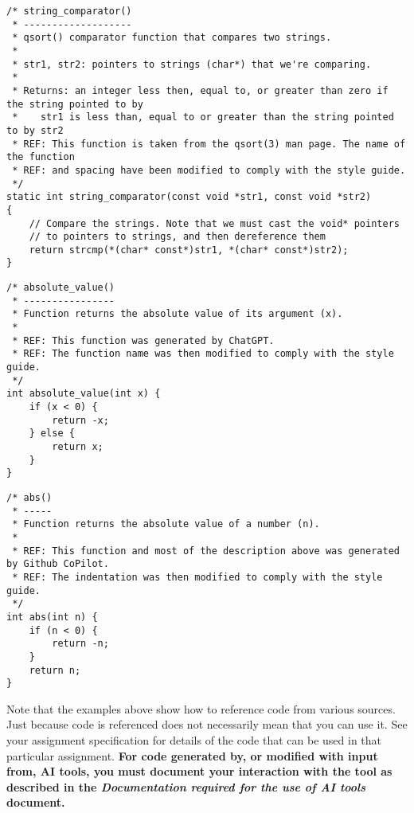 \documentclass{article}
\begin{document}
 
\begin{lstlisting}
/* string_comparator()
 * -------------------
 * qsort() comparator function that compares two strings.
 *
 * str1, str2: pointers to strings (char*) that we're comparing. 
 *
 * Returns: an integer less then, equal to, or greater than zero if the string pointed to by 
 *    str1 is less than, equal to or greater than the string pointed to by str2
 * REF: This function is taken from the qsort(3) man page. The name of the function 
 * REF: and spacing have been modified to comply with the style guide.
 */
static int string_comparator(const void *str1, const void *str2)
{
    // Compare the strings. Note that we must cast the void* pointers
    // to pointers to strings, and then dereference them
    return strcmp(*(char* const*)str1, *(char* const*)str2);
}
\end{lstlisting}

\begin{lstlisting}
/* absolute_value()
 * ----------------
 * Function returns the absolute value of its argument (x).
 *
 * REF: This function was generated by ChatGPT.
 * REF: The function name was then modified to comply with the style guide.
 */
int absolute_value(int x) {
    if (x < 0) {
        return -x;
    } else {
        return x;
    }
}
\end{lstlisting}

\begin{lstlisting}
/* abs()
 * -----
 * Function returns the absolute value of a number (n).
 *
 * REF: This function and most of the description above was generated by Github CoPilot.
 * REF: The indentation was then modified to comply with the style guide.
 */
int abs(int n) {
    if (n < 0) {
        return -n;
    }
    return n;
}
\end{lstlisting}

\linenumbers

Note that the examples above show how to reference code from various sources. Just because code is referenced
does not necessarily mean that you can use it. See your assignment specification for details of the code that can
be used in that particular assignment. \textbf{For code generated by, or modified with input from, AI tools, you must
document your interaction with the tool as described in the \textit{Documentation required for the use of AI tools} document.}
\end{document}

